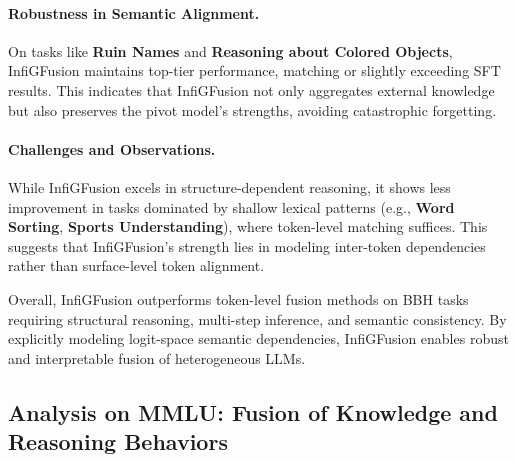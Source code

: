 \documentclass{article}
\begin{document}
\paragraph{Robustness in Semantic Alignment.}
On tasks like \textbf{Ruin Names} and \textbf{Reasoning about Colored Objects}, InfiGFusion maintains top-tier performance, matching or slightly exceeding SFT results. This indicates that InfiGFusion not only aggregates external knowledge but also preserves the pivot model’s strengths, avoiding catastrophic forgetting.

\paragraph{Challenges and Observations.}
While InfiGFusion excels in structure-dependent reasoning, it shows less improvement in tasks dominated by shallow lexical patterns (e.g., \textbf{Word Sorting}, \textbf{Sports Understanding}), where token-level matching suffices. This suggests that InfiGFusion’s strength lies in modeling inter-token dependencies rather than surface-level token alignment.

Overall, InfiGFusion outperforms token-level fusion methods on BBH tasks requiring structural reasoning, multi-step inference, and semantic consistency. By explicitly modeling logit-space semantic dependencies, InfiGFusion enables robust and interpretable fusion of heterogeneous LLMs.

\subsection{Analysis on MMLU: Fusion of Knowledge and Reasoning Behaviors}
\end{document}
